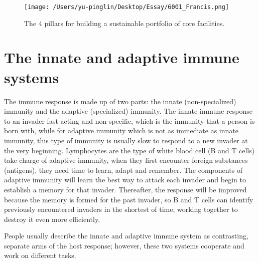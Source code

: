 \documentclass[12pt]{article}
\begin{document}
 \begin{figure}[H]
    \texttt{[image: /Users/yu-pinglin/Desktop/Essay/6001\_Francis.png]}
    \centering
    \caption{The 4 pillars for building a sustainable portfolio of
    core facilities.}
\end{figure}

\section{The innate and adaptive immune systems}
The immune response is made up of two parts: the innate (non-specialized) immunity and the adaptive (specialized) immunity. The innate immune response to an invader fast-acting and non-specific, which is the immunity that a person is born with, while for adaptive immunity which is not as immediate as innate immunity, this type of immunity is usually slow to respond to a new invader at the very beginning. Lymphocytes are the type of white blood cell (B and T cells) take charge of adaptive immunity, when they first encounter foreign substances (antigens), they need time to learn, adapt and remember. The components of adaptive immunity will learn the best way to attack each invader and begin to establish a memory for that invader. Thereafter, the response will be improved because the memory is formed for the past invader, so B and T cells can identify previously encountered invaders in the shortest of time, working together to destroy it even more efficiently.\medskip

People usually describe the innate and adaptive immune system as contrasting, separate arms of the host response; however, these two systems cooperate and work on different tasks.
\end{document}

